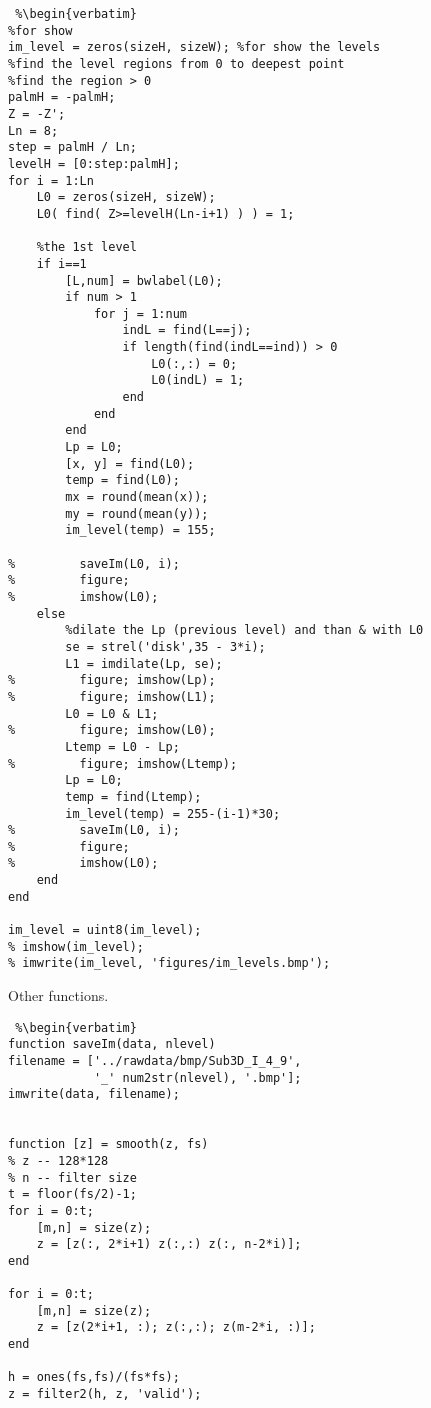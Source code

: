 \begin{lstlisting} %\begin{verbatim}
%for show
im_level = zeros(sizeH, sizeW); %for show the levels
%find the level regions from 0 to deepest point
%find the region > 0
palmH = -palmH;
Z = -Z';
Ln = 8;
step = palmH / Ln;
levelH = [0:step:palmH];
for i = 1:Ln
    L0 = zeros(sizeH, sizeW);
    L0( find( Z>=levelH(Ln-i+1) ) ) = 1;

    %the 1st level
    if i==1
        [L,num] = bwlabel(L0);
        if num > 1
            for j = 1:num
                indL = find(L==j);
                if length(find(indL==ind)) > 0
                    L0(:,:) = 0;
                    L0(indL) = 1;
                end
            end
        end
        Lp = L0;
        [x, y] = find(L0);
        temp = find(L0);
        mx = round(mean(x));
        my = round(mean(y));
        im_level(temp) = 155;

%         saveIm(L0, i);
%         figure;
%         imshow(L0);
    else
        %dilate the Lp (previous level) and than & with L0
        se = strel('disk',35 - 3*i);
        L1 = imdilate(Lp, se);
%         figure; imshow(Lp);
%         figure; imshow(L1);
        L0 = L0 & L1;
%         figure; imshow(L0);
        Ltemp = L0 - Lp;
%         figure; imshow(Ltemp);
        Lp = L0;
        temp = find(Ltemp);
        im_level(temp) = 255-(i-1)*30;
%         saveIm(L0, i);
%         figure;
%         imshow(L0);
    end
end

im_level = uint8(im_level);
% imshow(im_level);
% imwrite(im_level, 'figures/im_levels.bmp');
\end{lstlisting} %
\clearpage

Other functions.

\begin{lstlisting} %\begin{verbatim}
function saveIm(data, nlevel)
filename = ['../rawdata/bmp/Sub3D_I_4_9',
			'_' num2str(nlevel), '.bmp'];
imwrite(data, filename);


function [z] = smooth(z, fs)
% z -- 128*128
% n -- filter size
t = floor(fs/2)-1;
for i = 0:t;
    [m,n] = size(z);
    z = [z(:, 2*i+1) z(:,:) z(:, n-2*i)];
end

for i = 0:t;
    [m,n] = size(z);
    z = [z(2*i+1, :); z(:,:); z(m-2*i, :)];
end

h = ones(fs,fs)/(fs*fs);
z = filter2(h, z, 'valid');
\end{lstlisting} %
\clearpage
